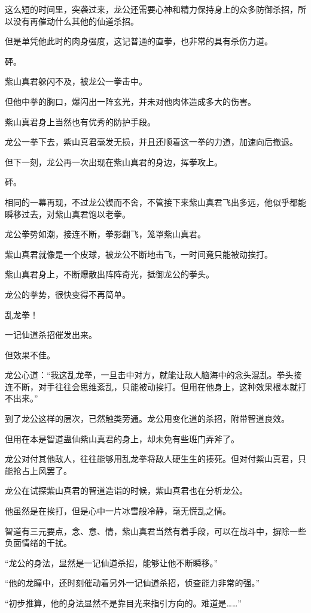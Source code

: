 \begin{this_body}
这么短的时间里，突袭过来，龙公还需要心神和精力保持身上的众多防御杀招，所以没有再催动什么其他的仙道杀招。

但是单凭他此时的肉身强度，这记普通的直拳，也非常的具有杀伤力道。

砰。

紫山真君躲闪不及，被龙公一拳击中。

但他中拳的胸口，爆闪出一阵玄光，并未对他肉体造成多大的伤害。

紫山真君身上当然也有优秀的防护手段。

龙公一拳下去，紫山真君毫发无损，并且还顺着这一拳的力道，加速向后撤退。

但下一刻，龙公再一次出现在紫山真君的身边，挥拳攻上。

砰。

相同的一幕再现，不过龙公锲而不舍，不管接下来紫山真君飞出多远，他似乎都能瞬移过去，对紫山真君饱以老拳。

龙公拳势如潮，接连不断，拳影翻飞，笼罩紫山真君。

紫山真君就像是一个皮球，被龙公不断地击飞，一时间竟只能被动挨打。

紫山真君身上，不断爆散出阵阵奇光，抵御龙公的拳头。

龙公的拳势，很快变得不再简单。

乱龙拳！

一记仙道杀招催发出来。

但效果不佳。

龙公心道：“我这乱龙拳，一旦击中对方，就能让敌人脑海中的念头混乱。拳头接连不断，对手往往会思维紊乱，只能被动挨打。但用在他身上，这种效果根本就打不出来。”

到了龙公这样的层次，已然触类旁通。龙公用变化道的杀招，附带智道良效。

但用在本是智道蛊仙紫山真君的身上，却未免有些班门弄斧了。

龙公对付其他敌人，往往能够用乱龙拳将敌人硬生生的揍死。但对付紫山真君，只能抢占上风罢了。

龙公在试探紫山真君的智道造诣的时候，紫山真君也在分析龙公。

他虽然是在挨打，但是心中一片冰雪般冷静，毫无慌乱之情。

智道有三元要点，念、意、情，紫山真君当然有着手段，可以在战斗中，摒除一些负面情绪的干扰。

“龙公的身法，显然是一记仙道杀招，能够让他不断瞬移。”

“他的龙瞳中，还时刻催动着另外一记仙道杀招，侦查能力非常的强。”

“初步推算，他的身法显然不是靠目光来指引方向的。难道是……”

\end{this_body}

